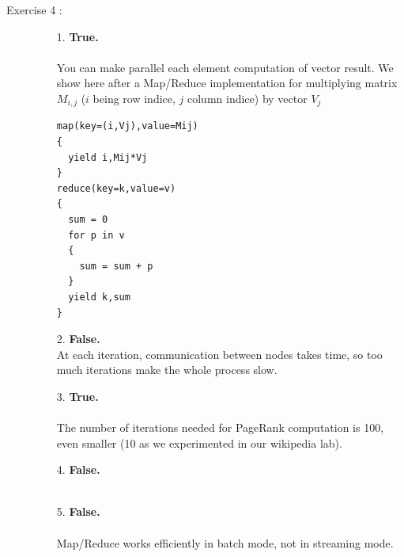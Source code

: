 \documentclass[pdftex,a4paper,DIV15]{scrartcl}
\begin{document}
\begin{description}
\item[Exercise 4 :] 

\begin{itemize}

\item[1.] \textbf{True.}\\
\\
You can make parallel each element computation of vector result. We show here after a Map/Reduce implementation
for multiplying matrix $M_{i,j}$ ($i$ being row indice, $j$ column indice) by vector $V_{j}$
\begin{verbatim}
map(key=(i,Vj),value=Mij)
{
  yield i,Mij*Vj
}
reduce(key=k,value=v)
{
  sum = 0
  for p in v
  {
    sum = sum + p
  }
  yield k,sum
}
\end{verbatim}


\item[2.] \textbf{False.}\\

At each iteration, communication between nodes takes time, so too much iterations make the whole process slow.
\item[3.] \textbf{True.}\\
\\
The number of iterations needed for PageRank computation is 100, even smaller (10 as we experimented in our wikipedia lab).
\item[4.] \textbf{False.}\\
\\

\item[5.] \textbf{False.}\\
\\
Map/Reduce works efficiently in batch mode, not in streaming mode.
\end{itemize}

\end{description}
\end{document}
